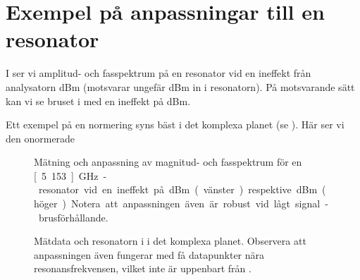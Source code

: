 \documentclass[main.tex]{subfiles}
\begin{document}
\section{Exempel på anpassningar till en resonator}

I  ser vi amplitud- och fasspektrum på en resonator vid en ineffekt från analysatorn \unit[-40]{dBm} (motsvarar ungefär \unit[-107]{dBm} in i resonatorn). På motsvarande sätt kan vi se bruset i  med en ineffekt på \unit[-90]{dBm}.

Ett exempel på en normering syns bäst i det komplexa planet (se ). Här ser vi den onormerade 


\begin{figure}[H]
    \begin{subfigure}[t]{0.5\textwidth}
        \centerfloat
        \setlength{}
        \setlength\figureheight{20em}
        
    \end{subfigure}
    \begin{subfigure}[t]{0.5\textwidth}
        \centerfloat
        \setlength{}
        \setlength\figureheight{20em}
        
    \end{subfigure}
    \caption{Mätning och anpassning av magnitud- och fasspektrum för en \unit[5.153]{GHz}-resonator vid en ineffekt på \unit[-40]{dBm} (vänster) respektive \unit[-70]{dBm} (höger). Notera att anpassningen även är robust vid lågt signal-brusförhållande.}
    \label{fig:ex_magphs_resonator}
\end{figure}

\begin{figure}[H]
    \begin{subfigure}[t]{0.5\textwidth}
        \centerfloat
        \setlength{}
        \setlength\figureheight{13em}
        
    \end{subfigure}
    \begin{subfigure}[t]{0.5\textwidth}
        \centerfloat
        \setlength{}
        \setlength\figureheight{13em}
        
    \end{subfigure}
    \caption{Mätdata och resonatorn i  i det komplexa planet. Observera att anpassningen även fungerar med få datapunkter nära resonansfrekvensen, vilket inte är uppenbart från .}
    \label{fig:ex_cmplx_resonator}
\end{figure}
\end{document}
